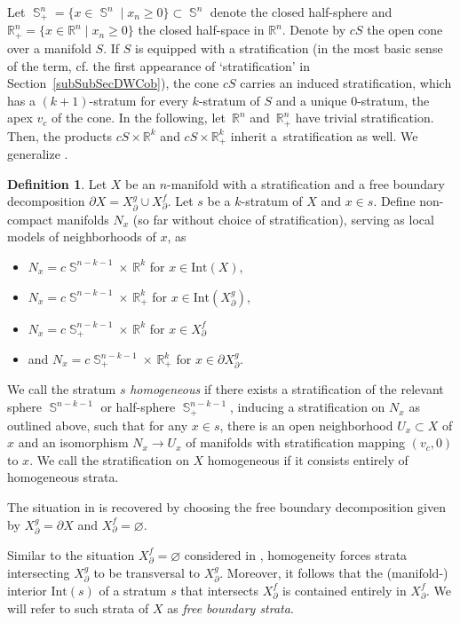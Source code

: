 \documentclass[10pt,a4paper]{amsart}
\DeclareMathOperator{\Sp}{\mathbb{S}}
\numberwithin{equation}{section}
\theoremstyle{definition}
\newtheorem{Definition}[Definition]{Definition}
\begin{document}
Let $\Sp_+^n = \{x \in \Sp^n\mid x_n \geq 0\} \subset \Sp^n$ denote the closed half-sphere and $\mathbb{R}_+^n = \{x \in \mathbb{R}^n \mid x_n \geq 0\}$ the closed half-space in $\mathbb{R}^n$. Denote by $cS$ the open cone over a manifold $S$. If $S$ is equipped with a stratification (in the most basic sense of the term, cf. the first appearance of `stratification' in Section~\ref{subSubSecDWCob}), the cone $cS$ carries an induced stratification, which has a $(k+1)$-stratum for every $k$-stratum of $S$ and a unique 0-stratum, the apex $v_c$ of the cone. In the following, let~$\mathbb{R}^n$ and~$ \mathbb{R}_+^n$ have trivial stratification. Then, the products $cS \times \mathbb{R}^k$ and $cS \times \mathbb{R}_+^k$ inherit a~stratification as well. We generalize \cite[Definition~3.7]{FMM}.
\begin{Definition}
 \label{defFBHomStr}
 Let $X$ be an $n$-manifold with a stratification and a free boundary decomposition $\partial X = X_{\partial}^g \cup X_{\partial}^f$. Let $s$ be a $k$-stratum of $X$ and $x \in s$. Define non-compact manifolds $N_x$ (so far without choice of stratification), serving as local models of neighborhoods of $x$, as
 \begin{itemize}\itemsep=0pt
 \item $N_x = c\Sp^{n-k-1} \times \, \mathbb{R}^k$ for $x \in \mathrm{Int}(X)$,
 \item $N_x = c\Sp^{n-k-1} \times \, \mathbb{R}_+^k$ for $x \in \mathrm{Int}(X_{\partial}^g)$,
 \item $N_x = c\Sp_+^{n-k-1} \times \, \mathbb{R}^k$ for $x \in X_{\partial}^f$
 \item and $N_x = c\Sp_+^{n-k-1} \times \, \mathbb{R}_+^k$ for $x \in \partial X_{\partial}^g$.
 \end{itemize}
 We call the stratum $s$ \textit{homogeneous} if there exists a stratification of the relevant sphere $\Sp^{n-k-1}$ or half-sphere $\Sp_+^{n-k-1}$, inducing a stratification on $N_x$ as outlined above, such that for any $x \in s$, there is an open neighborhood $U_x \subset X$ of $x$ and an isomorphism $N_x \rightarrow U_x$ of manifolds with stratification mapping $(v_c, 0)$ to $x$. We call the stratification on $X$ homogeneous if it consists entirely of homogeneous strata.
\end{Definition}
The situation in \cite{FMM} is recovered by choosing the free boundary decomposition given by $X_{\partial}^g = \partial X$ and $X_{\partial}^f = \varnothing$.

Similar to the situation $X_{\partial}^f = \varnothing$ considered in \cite{FMM}, homogeneity forces strata intersecting $X_{\partial}^g$ to be transversal to $X_{\partial}^g$. Moreover, it follows that the (manifold-) interior $\mathrm{Int}(s)$ of a stratum $s$ that intersects $X_{\partial}^f$ is contained entirely in $X_{\partial}^f$. We will refer to such strata of $X$ as \textit{free boundary strata}.
\end{document}
